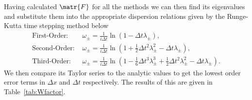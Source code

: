 Having calculated $\matr{F}$ for all the methods we can then find its eigenvalues and substitute them into the appropriate dispersion relations given by the Runge-Kutta time stepping method below
\begin{subequations}
	\label{eqn:taylorseries1}
\begin{align}
\text{First-Order:    }&\omega_\pm = \frac{1}{i \Delta t} \ln\left(1 - \Delta t \lambda_\pm\right),\\
\text{Second-Order:    }&\omega_\pm = \frac{1}{i \Delta t} \ln\left(1 + \frac{1}{2}\Delta t^2 \lambda_\pm^2  -\Delta t\lambda_\pm\right),\\
\text{Third-Order:    }&\omega_\pm = \frac{1}{i \Delta t} \ln\left(1 - \frac{1}{6}\Delta t^3 \lambda_\pm^3 + \frac{1}{2}\Delta t^2 \lambda_\pm^2  -\Delta t\lambda_\pm\right).
\end{align}
\end{subequations}
We then compare its Taylor series to the analytic values to get the lowest order error terms in $\Delta x$ and $\Delta t$ respectively. The results of this are given in Table~\ref{tab:Wfactor}.

